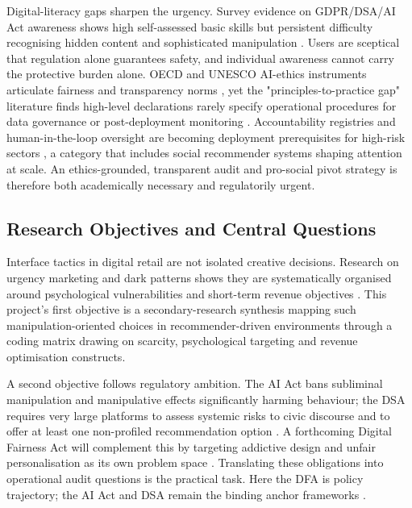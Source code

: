 \documentclass[11pt]{article}
\begin{document}
Digital-literacy gaps sharpen the urgency. Survey evidence on GDPR/DSA/AI Act awareness shows high self-assessed basic skills but persistent difficulty recognising hidden content and sophisticated manipulation \parencites[2]{9360054}[12]{6502223}. Users are sceptical that regulation alone guarantees safety, and individual awareness cannot carry the protective burden alone. OECD and UNESCO AI-ethics instruments articulate fairness and transparency norms \parencites[9]{7461574}[12]{6502223}[12]{8367105}, yet the "principles-to-practice gap" literature finds high-level declarations rarely specify operational procedures for data governance or post-deployment monitoring \parencites[9]{7461574}[12]{8367105}. Accountability registries and human-in-the-loop oversight are becoming deployment prerequisites for high-risk sectors \parencites[83]{2977039}[11]{5419804}[21]{6805789}[108]{2977039}, a category that includes social recommender systems shaping attention at scale. An ethics-grounded, transparent audit and pro-social pivot strategy is therefore both academically necessary and regulatorily urgent.

\subsection{Research Objectives and Central Questions}
\label{sec:research_objectives_central_questions} Interface tactics in digital retail are not isolated creative decisions. Research on urgency marketing and dark patterns shows they are systematically organised around psychological vulnerabilities and short-term revenue objectives \parencites[136]{8745065}. This project's first objective is a secondary-research synthesis mapping such manipulation-oriented choices in recommender-driven environments through a coding matrix drawing on scarcity, psychological targeting and revenue optimisation constructs.

A second objective follows regulatory ambition. The AI Act bans subliminal manipulation and manipulative effects significantly harming behaviour; the DSA requires very large platforms to assess systemic risks to civic discourse and to offer at least one non-profiled recommendation option \parencites[2248]{6502223}. A forthcoming Digital Fairness Act will complement this by targeting addictive design and unfair personalisation as its own problem space \parencites[390]{7896734}. Translating these obligations into operational audit questions is the practical task. Here the DFA is policy trajectory; the AI Act and DSA remain the binding anchor frameworks \parencites[390]{7896734}[2248]{6502223}.
\end{document}
